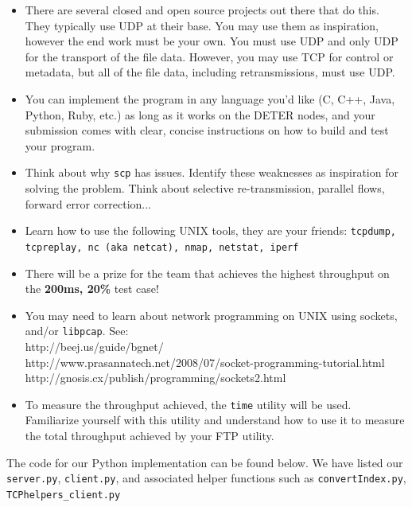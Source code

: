 \documentclass[10pt]{article}
\begin{document}
\begin{itemize}
\itemsep0em
\item There are several closed and open source projects out there that do this. They typically use UDP at their base. You may use them as inspiration, however the end work must be your own. You must use UDP and only UDP for the transport of the file data. However, you may use TCP for control or metadata, but all of the file data, including retransmissions, must use UDP.
\item You can implement the program in any language you'd like (C, C++, Java, Python, Ruby, etc.) as long as it works on the DETER nodes, and your submission comes with clear, concise instructions on how to build and test your program.
\item Think about why \texttt{scp} has issues. Identify these weaknesses as inspiration for solving the problem. Think about selective re-transmission, parallel flows, forward error correction...
\item Learn how to use the following UNIX tools, they are your friends: \texttt{tcpdump, tcpreplay, nc (aka netcat), nmap, netstat, iperf}
\item There will be a prize for the team that achieves the highest throughput on the \textbf{200ms, 20\%} test case!
\item You may need to learn about network programming on UNIX using sockets, and/or \texttt{libpcap}. See: \\
http://beej.us/guide/bgnet/\\
http://www.prasannatech.net/2008/07/socket-programming-tutorial.html\\
http://gnosis.cx/publish/programming/sockets2.html
\item To measure the throughput achieved, the \texttt{time} utility will be used. Familiarize yourself with this utility and understand how to use it to measure the total throughput achieved by your FTP utility.
\end{itemize}

\newpage
The code for our Python implementation can be found below.  We have listed our \texttt{server.py}, \texttt{client.py}, and associated helper functions such as \texttt{convertIndex.py}, \texttt{TCPhelpers\_client.py}
\end{document}
